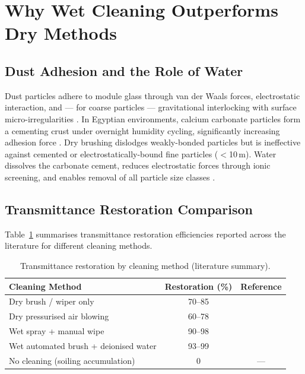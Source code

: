 \documentclass[12pt,a4paper]{report}
\numberwithin{equation}{chapter}
\numberwithin{figure}{chapter}
\numberwithin{table}{chapter}
\begin{document}
\section{Why Wet Cleaning Outperforms Dry Methods}

\subsection{Dust Adhesion and the Role of Water}

Dust particles adhere to module glass through van der Waals forces, electrostatic
interaction, and --- for coarse particles --- gravitational interlocking with surface
micro-irregularities \cite{sarver2013pvsoiling}. In Egyptian environments, calcium
carbonate particles form a cementing crust under overnight humidity cycling, significantly
increasing adhesion force \cite{kazem2023soiling}. Dry brushing dislodges weakly-bonded
particles but is ineffective against cemented or electrostatically-bound fine particles
($<$10\,\textmu m). Water dissolves the carbonate cement, reduces electrostatic forces
through ionic screening, and enables removal of all particle size classes
\cite{mejia2021cleaning}.

\subsection{Transmittance Restoration Comparison}

Table~\ref{tab:cleaning_comparison} summarises transmittance restoration efficiencies
reported across the literature for different cleaning methods.

\begin{table}[H]
\centering
\caption{Transmittance restoration by cleaning method (literature summary).}
\label{tab:cleaning_comparison}
\begin{tabular}{lcc}
\toprule
\textbf{Cleaning Method} & \textbf{Restoration (\%)} & \textbf{Reference} \\
\midrule
Dry brush / wiper only               & 70--85 & \cite{mejia2021cleaning,costa2021pvrobot} \\
Dry pressurised air blowing          & 60--78 & \cite{kazem2023soiling} \\
Wet spray + manual wipe              & 90--98 & \cite{mejia2021cleaning} \\
Wet automated brush + deionised water & 93--99 & \cite{beattie2012waterspots} \\
No cleaning (soiling accumulation)   & 0      & --- \\
\bottomrule
\end{tabular}
\end{table}
\end{document}
